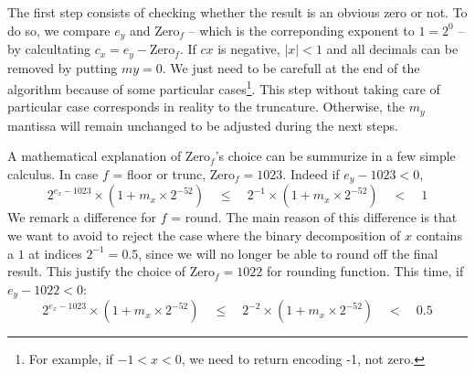 \documentclass[runningheads]{llncs}
\begin{document}
        The first step consists of checking whether the result is an obvious zero or not.
        To do so, we compare $e_y$ and Zero$_f$ -- which is the correponding exponent to  $1=2^0$ -- by calcultating $c_x = e_y - \text{Zero}_f$.
        If $cx$ is negative, $\mid x \mid <1$ and all decimals can be removed by putting $my = 0$.
        We just need to be carefull at the end of the algorithm because of some particular cases\footnote{For example, if $-1<x<0$, we need to return encoding -1, not zero.}.
        This step without taking care of particular case corresponds in reality to the truncature.
        Otherwise, the $m_y$ mantissa will remain unchanged to be adjusted during the next steps.

        A mathematical explanation of Zero$_f$'s choice can be summurize in a few simple calculus.
        In case $f$ = floor or trunc, Zero$_f = 1023$.
        Indeed if $e_y -1023 <0$, $$2^{e_x-1023} \times (1+m_x\times 2^{-52})\quad\leq \quad 2^{-1} \times (1+m_x\times 2^{-52}) \quad< \quad 1$$ 
        We remark a difference for $f$ = round.
        The main reason of this difference is that we want to avoid to reject the case where the binary decomposition of $x$ contains a $1$ at indices $2^{-1} = 0.5$, 
        since we will no longer be able to round off the final result.
        This justify the choice of  Zero$_f =1022$ for rounding function.
        This time, if $e_y -1022 <0$: 
        $$2^{e_x-1023} \times (1+m_x\times 2^{-52})\quad\leq \quad 2^{-2} \times (1+m_x\times 2^{-52}) \quad< \quad 0.5$$ 
        
\end{document}
